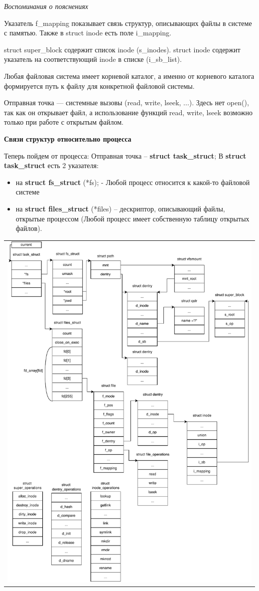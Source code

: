 \textit{Воспоминания о пояснениях}

Указатель f\_mapping показывает связь структур, описывающих файлы в системе с памятью. Также в struct inode есть поле i\_mapping.

struct super\_block содержит список inode (s\_inodes). struct inode содержит указатель на соответствующий inode в списке (i\_sb\_list).

Любая файловая система имеет корневой каталог, а именно от корневого каталога формируется путь к файлу для конкретной файловой системы.

Отправная точка — системные вызовы (read, write, lseek, ...). Здесь нет open(), так как он открывает файл, а использование функций read, write, lseek возможно только при работе с открытым файлом.

\textbf{Связи структур относительно процесса}
\par Теперь пойдем от процесса: Отправная точка -- \textbf{struct task\_struct};
В \textbf{struct task\_struct} есть 2 указателя: 
\begin{itemize}
\item на \textbf{struct fs\_struct} (*fs); - Любой процесс относится к какой-то файловой системе
\item на \textbf{struct files\_struct} (*files) -- дескриптор, описывающий файлы, открытые процессом (Любой процесс имеет собственную таблицу открытых файлов).
\end{itemize}

\begin{table}[H]
  \centering
  \begin{tabular}{p{1\linewidth}}
    \centering
    \includegraphics[width=0.8\linewidth]{./images/struct_connect_proc.pdf}
  \end{tabular}
\end{table}

